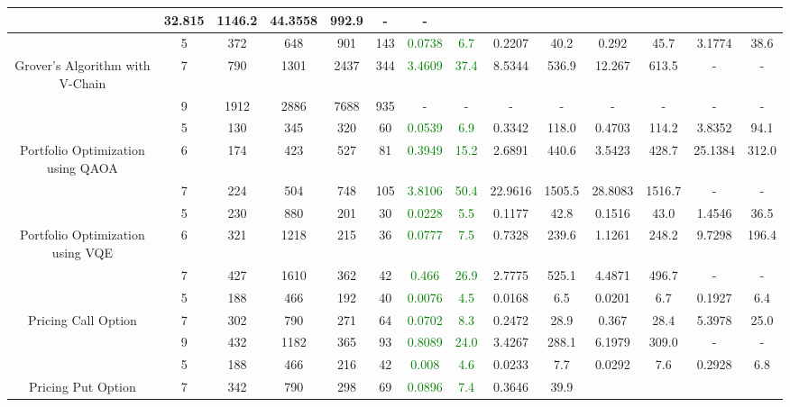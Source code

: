 \begin{table}[htb]
{\begin{tabular}{|c|c|c|c|c|c|c|c|c|c|c|c|c|c|}
 & 32.815 & 1146.2
 & 44.3558 & 992.9
 & - & -
 \\
\hline
 & 
5 & 372 & 648 & 901 & 143
 & \textcolor{green}{0.0738} & \textcolor{green}{6.7}
 & 0.2207 & 40.2
 & 0.292 & 45.7
 & 3.1774 & 38.6
 \\
Grover's Algorithm with V-Chain & 
7 & 790 & 1301 & 2437 & 344
 & \textcolor{green}{3.4609} & \textcolor{green}{37.4}
 & 8.5344 & 536.9
 & 12.267 & 613.5
 & - & -
 \\
 & 
9 & 1912 & 2886 & 7688 & 935
 & - & -
 & - & -
 & - & -
 & - & -
 \\
\hline
 & 
5 & 130 & 345 & 320 & 60
 & \textcolor{green}{0.0539} & \textcolor{green}{6.9}
 & 0.3342 & 118.0
 & 0.4703 & 114.2
 & 3.8352 & 94.1
 \\
Portfolio Optimization using QAOA & 
6 & 174 & 423 & 527 & 81
 & \textcolor{green}{0.3949} & \textcolor{green}{15.2}
 & 2.6891 & 440.6
 & 3.5423 & 428.7
 & 25.1384 & 312.0
 \\
 & 
7 & 224 & 504 & 748 & 105
 & \textcolor{green}{3.8106} & \textcolor{green}{50.4}
 & 22.9616 & 1505.5
 & 28.8083 & 1516.7
 & - & -
 \\
\hline
 & 
5 & 230 & 880 & 201 & 30
 & \textcolor{green}{0.0228} & \textcolor{green}{5.5}
 & 0.1177 & 42.8
 & 0.1516 & 43.0
 & 1.4546 & 36.5
 \\
Portfolio Optimization using VQE & 
6 & 321 & 1218 & 215 & 36
 & \textcolor{green}{0.0777} & \textcolor{green}{7.5}
 & 0.7328 & 239.6
 & 1.1261 & 248.2
 & 9.7298 & 196.4
 \\
 & 
7 & 427 & 1610 & 362 & 42
 & \textcolor{green}{0.466} & \textcolor{green}{26.9}
 & 2.7775 & 525.1
 & 4.4871 & 496.7
 & - & -
 \\
\hline
 & 
5 & 188 & 466 & 192 & 40
 & \textcolor{green}{0.0076} & \textcolor{green}{4.5}
 & 0.0168 & 6.5
 & 0.0201 & 6.7
 & 0.1927 & 6.4
 \\
Pricing Call Option & 
7 & 302 & 790 & 271 & 64
 & \textcolor{green}{0.0702} & \textcolor{green}{8.3}
 & 0.2472 & 28.9
 & 0.367 & 28.4
 & 5.3978 & 25.0
 \\
 & 
9 & 432 & 1182 & 365 & 93
 & \textcolor{green}{0.8089} & \textcolor{green}{24.0}
 & 3.4267 & 288.1
 & 6.1979 & 309.0
 & - & -
 \\
\hline
 & 
5 & 188 & 466 & 216 & 42
 & \textcolor{green}{0.008} & \textcolor{green}{4.6}
 & 0.0233 & 7.7
 & 0.0292 & 7.6
 & 0.2928 & 6.8
 \\
Pricing Put Option & 
7 & 342 & 790 & 298 & 69
 & \textcolor{green}{0.0896} & \textcolor{green}{7.4}
 & 0.3646 & 39.9

\end{tabular}}
\end{table}
